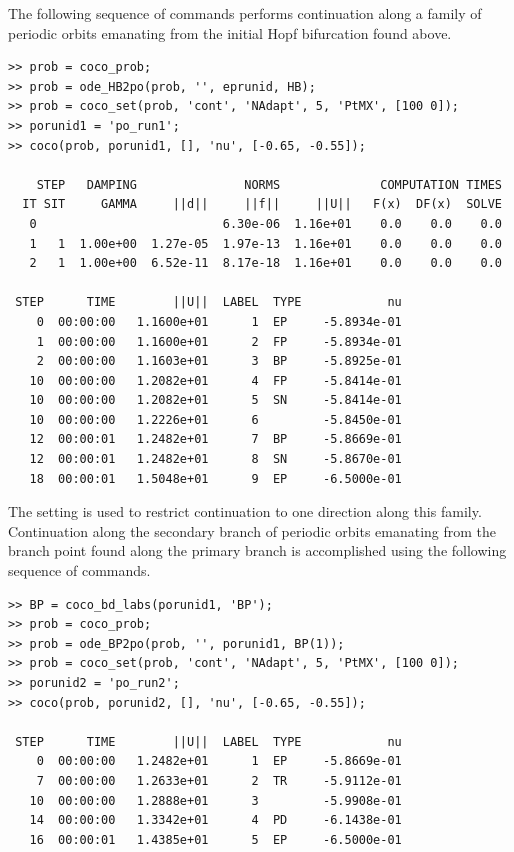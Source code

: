 The following sequence of commands performs continuation along a family of periodic orbits emanating from the initial Hopf bifurcation found above.
\begin{lstlisting}[language=coco-highlight,frame=lines]
>> prob = coco_prob;
>> prob = ode_HB2po(prob, '', eprunid, HB);
>> prob = coco_set(prob, 'cont', 'NAdapt', 5, 'PtMX', [100 0]);
>> porunid1 = 'po_run1';
>> coco(prob, porunid1, [], 'nu', [-0.65, -0.55]);

    STEP   DAMPING               NORMS              COMPUTATION TIMES
  IT SIT     GAMMA     ||d||     ||f||     ||U||   F(x)  DF(x)  SOLVE
   0                          6.30e-06  1.16e+01    0.0    0.0    0.0
   1   1  1.00e+00  1.27e-05  1.97e-13  1.16e+01    0.0    0.0    0.0
   2   1  1.00e+00  6.52e-11  8.17e-18  1.16e+01    0.0    0.0    0.0

 STEP      TIME        ||U||  LABEL  TYPE            nu
    0  00:00:00   1.1600e+01      1  EP     -5.8934e-01
    1  00:00:00   1.1600e+01      2  FP     -5.8934e-01
    2  00:00:00   1.1603e+01      3  BP     -5.8925e-01
   10  00:00:00   1.2082e+01      4  FP     -5.8414e-01
   10  00:00:00   1.2082e+01      5  SN     -5.8414e-01
   10  00:00:00   1.2226e+01      6         -5.8450e-01
   12  00:00:01   1.2482e+01      7  BP     -5.8669e-01
   12  00:00:01   1.2482e+01      8  SN     -5.8670e-01
   18  00:00:01   1.5048e+01      9  EP     -6.5000e-01
\end{lstlisting}
The  setting is used to restrict continuation to one direction along this family. Continuation along the secondary branch of periodic orbits emanating from the branch point found along the primary branch is accomplished using the following sequence of commands.
\begin{lstlisting}[language=coco-highlight,frame=lines]
>> BP = coco_bd_labs(porunid1, 'BP');
>> prob = coco_prob;
>> prob = ode_BP2po(prob, '', porunid1, BP(1));
>> prob = coco_set(prob, 'cont', 'NAdapt', 5, 'PtMX', [100 0]);
>> porunid2 = 'po_run2';
>> coco(prob, porunid2, [], 'nu', [-0.65, -0.55]);

 STEP      TIME        ||U||  LABEL  TYPE            nu
    0  00:00:00   1.2482e+01      1  EP     -5.8669e-01
    7  00:00:00   1.2633e+01      2  TR     -5.9112e-01
   10  00:00:00   1.2888e+01      3         -5.9908e-01
   14  00:00:00   1.3342e+01      4  PD     -6.1438e-01
   16  00:00:01   1.4385e+01      5  EP     -6.5000e-01
\end{lstlisting}

